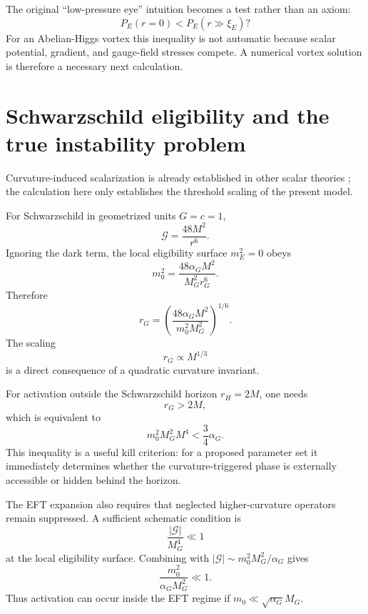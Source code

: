 \documentclass[11pt]{article}
\newcommand{\Geff}{\mathcal G}
\begin{document}
The original ``low-pressure eye'' intuition becomes a test rather than an axiom:
\begin{equation}
P_E(r=0)<P_E(r\gg \xi_E)?
\label{eq:pressuretest}
\end{equation}
For an Abelian-Higgs vortex this inequality is not automatic because scalar potential, gradient, and gauge-field stresses compete.  A numerical vortex solution is therefore a necessary next calculation.

\section{Schwarzschild eligibility and the true instability problem}

Curvature-induced scalarization is already established in other scalar theories \citep{DonevaYazadjiev2018}; the calculation here only establishes the threshold scaling of the present model.

For Schwarzschild in geometrized units $G=c=1$,
\begin{equation}
\Geff=\frac{48M^2}{r^6}.
\end{equation}
Ignoring the dark term, the local eligibility surface $m_E^2=0$ obeys
\begin{equation}
m_0^2=\frac{48\alpha_G M^2}{M_G^2 r_G^6}.
\end{equation}
Therefore
\begin{equation}
\boxed{
r_G=
\left(
\frac{48\alpha_G M^2}{m_0^2M_G^2}
\right)^{1/6}.
}
\label{eq:rG}
\end{equation}
The scaling
\begin{equation}
r_G\propto M^{1/3}
\end{equation}
is a direct consequence of a quadratic curvature invariant.

For activation outside the Schwarzschild horizon $r_H=2M$, one needs
\begin{equation}
r_G>2M,
\end{equation}
which is equivalent to
\begin{equation}
\boxed{
m_0^2M_G^2M^4<\frac{3}{4}\alpha_G.}
\label{eq:outside}
\end{equation}
This inequality is a useful kill criterion: for a proposed parameter set it immediately determines whether the curvature-triggered phase is externally accessible or hidden behind the horizon.

The EFT expansion also requires that neglected higher-curvature operators remain suppressed.  A sufficient schematic condition is
\begin{equation}
\frac{|\Geff|}{M_G^4}\ll1
\end{equation}
at the local eligibility surface.  Combining with $|\Geff|\sim m_0^2M_G^2/\alpha_G$ gives
\begin{equation}
\frac{m_0^2}{\alpha_G M_G^2}\ll1.
\label{eq:EFTcontrol}
\end{equation}
Thus activation can occur inside the EFT regime if $m_0\ll \sqrt{\alpha_G}M_G$.
\end{document}
